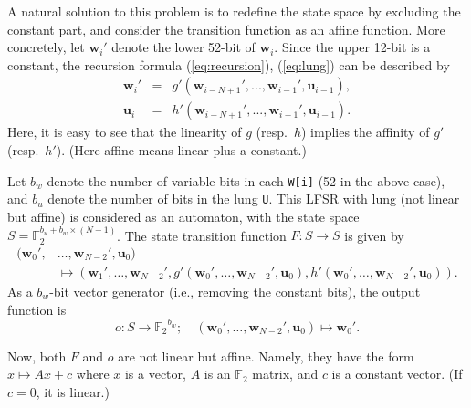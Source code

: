 \documentclass{svmult}
\begin{document}
A natural solution to this problem is to redefine
the state space by excluding the constant part, 
and consider the transition function as an 
affine function.
More concretely, let $\mathbf{w}_{i}'$ denote the
lower 52-bit of $\mathbf{w}_i$. Since the upper 12-bit
is a constant, the recursion
formula (\ref{eq:recursion}), (\ref{eq:lung})
can be described by
\begin{eqnarray}
  \mathbf{w}_i' &=& g'(\mathbf{w}_{i-N+1}', ..., \mathbf{w}_{i-1}',
  \mathbf{u}_{i-1}), \label{eq:recursion-dash} \\
  \mathbf{u}_i &=& h'(\mathbf{w}_{i-N+1}', ..., \mathbf{w}_{i-1}',
  \mathbf{u}_{i-1}). \label{eq:lung-dash}
\end{eqnarray}
Here, it is easy to see that the linearity of $g$ (resp.\ $h$)
implies the affinity of $g'$ (resp.\ $h'$). (Here affine means
linear plus a constant.)

Let $b_w$ denote the number of variable bits 
in each \texttt{W[i]} (52 in the above case), 
and $b_u$ denote the number of bits in the 
lung \texttt{U}.
This LFSR with lung (not linear but affine)
is considered as an automaton, with the state space 
$S={\mathbb F}_2^{b_u + b_w \times (N-1)}$.
The state transition function $F: S \to S$ is given by
\begin{equation*}
  \begin{split}
    (\mathbf{w}_0', &\ldots,\mathbf{w}_{N-2}', \mathbf{u}_0) \\
    &\mapsto 
    (\mathbf{w}_1',\ldots,\mathbf{w}_{N-2}',
    g'(\mathbf{w}_0',\ldots,\mathbf{w}_{N-2}', \mathbf{u}_0),
    h'(\mathbf{w}_0',\ldots,\mathbf{w}_{N-2}', \mathbf{u}_0)).
  \end{split}
\end{equation*}
As a $b_w$-bit vector generator (i.e., removing
the constant bits), the output function is 
\[
  o: S \to {{\mathbb F}_2}^{b_w}; \quad
  (\mathbf{w}_0', \ldots, \mathbf{w}_{N-2}', \mathbf{u}_0) 
  \mapsto \mathbf{w}_0'.
\]

Now, both $F$ and $o$ are not linear
but affine. Namely, they have the form 
$x \mapsto Ax+c$ where $x$ is a vector, $A$ is an
$\mathbb{F}_2$ matrix, and $c$ is a constant vector.
(If $c=0$, it is linear.)

\end{document}
